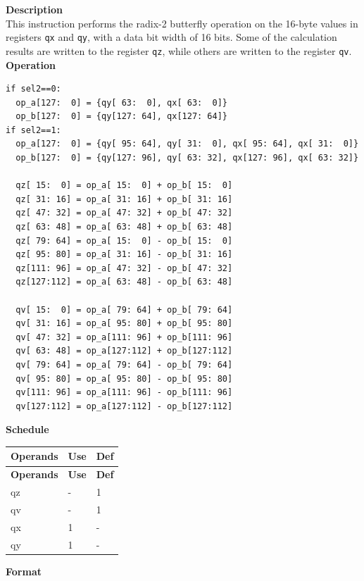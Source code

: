 \textbf{Description}\\
This instruction performs the radix-2 butterfly operation on the 16-byte values in registers \lstinline{qx} and \lstinline{qy}, with a data bit width of 16 bits. Some of the calculation results are written to the register \lstinline{qz}, while others are written to the register \lstinline{qv}.\\
\textbf{Operation}
\begin{lstlisting}
if sel2==0:
  op_a[127:  0] = {qy[ 63:  0], qx[ 63:  0]}
  op_b[127:  0] = {qy[127: 64], qx[127: 64]}
if sel2==1:
  op_a[127:  0] = {qy[ 95: 64], qy[ 31:  0], qx[ 95: 64], qx[ 31:  0]}
  op_b[127:  0] = {qy[127: 96], qy[ 63: 32], qx[127: 96], qx[ 63: 32]}

  qz[ 15:  0] = op_a[ 15:  0] + op_b[ 15:  0]
  qz[ 31: 16] = op_a[ 31: 16] + op_b[ 31: 16]
  qz[ 47: 32] = op_a[ 47: 32] + op_b[ 47: 32]
  qz[ 63: 48] = op_a[ 63: 48] + op_b[ 63: 48]
  qz[ 79: 64] = op_a[ 15:  0] - op_b[ 15:  0]
  qz[ 95: 80] = op_a[ 31: 16] - op_b[ 31: 16]
  qz[111: 96] = op_a[ 47: 32] - op_b[ 47: 32]
  qz[127:112] = op_a[ 63: 48] - op_b[ 63: 48]

  qv[ 15:  0] = op_a[ 79: 64] + op_b[ 79: 64]
  qv[ 31: 16] = op_a[ 95: 80] + op_b[ 95: 80]
  qv[ 47: 32] = op_a[111: 96] + op_b[111: 96]
  qv[ 63: 48] = op_a[127:112] + op_b[127:112]
  qv[ 79: 64] = op_a[ 79: 64] - op_b[ 79: 64]
  qv[ 95: 80] = op_a[ 95: 80] - op_b[ 95: 80]
  qv[111: 96] = op_a[111: 96] - op_b[111: 96]
  qv[127:112] = op_a[127:112] - op_b[127:112]
\end{lstlisting}

\textbf{Schedule}\\
\begin{longtable}[c]{|l|l|l|}
    \hline
    \rowcolor{lightgray}
    \textbf{Operands} & \textbf{Use} & \textbf{Def} \\\hline
    \endfirsthead
    \hline
    \rowcolor{lightgray}
     \textbf{Operands} & \textbf{Use} & \textbf{Def} \\\hline
    \endhead
    \hline
    \endfoot

  qz & - & 1 \\\hline
  qv & - & 1 \\\hline
  qx & 1 & - \\\hline
  qy & 1 & -

\end{longtable}

\textbf{Format}\\

